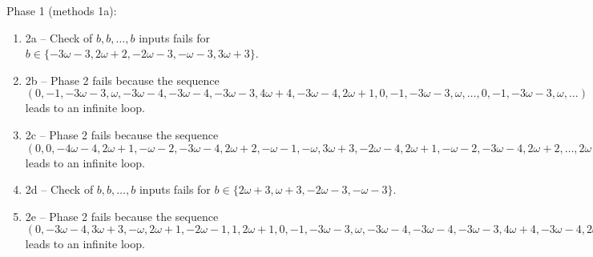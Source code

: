 \begin{exmp}
Phase 1 (methods 1a):
\begin{enumerate}[ ]
\item  2a -- Check of $b,\allowbreak b,\allowbreak \dots,\allowbreak b$ inputs fails for $b\in \{-3\omega - 3,\allowbreak  2\omega + 2,\allowbreak  -2\omega - 3,\allowbreak  -\omega - 3,\allowbreak  3\omega + 3\}$.
\item  2b -- Phase 2   fails because  the sequence $(0,\allowbreak  -1,\allowbreak  -3\omega - 3,\allowbreak  \omega,\allowbreak  -3\omega - 4,\allowbreak  -3\omega - 4,\allowbreak  -3\omega - 3,\allowbreak  4\omega + 4,\allowbreak  -3\omega - 4,\allowbreak  2\omega + 1,\allowbreak  0,\allowbreak  -1,\allowbreak  -3\omega - 3,\allowbreak  \omega,\allowbreak  \dots ,\allowbreak 0,\allowbreak  -1,\allowbreak  -3\omega - 3,\allowbreak  \omega,\allowbreak  \dots)$ leads to an infinite loop.
\item  2c -- Phase 2   fails because  the sequence $(0,\allowbreak  0,\allowbreak  -4\omega - 4,\allowbreak  2\omega + 1,\allowbreak  -\omega - 2,\allowbreak  -3\omega - 4,\allowbreak  2\omega + 2,\allowbreak  -\omega - 1,\allowbreak  -\omega,\allowbreak  3\omega + 3,\allowbreak  -2\omega - 4,\allowbreak  2\omega + 1,\allowbreak  -\omega - 2,\allowbreak  -3\omega - 4,\allowbreak  2\omega + 2,\allowbreak  \dots ,\allowbreak 2\omega + 1,\allowbreak  -\omega - 2,\allowbreak  -3\omega - 4,\allowbreak  2\omega + 2,\allowbreak  \dots)$ leads to an infinite loop.
\item  2d -- Check of $b,\allowbreak b,\allowbreak \dots,\allowbreak b$ inputs fails for $b\in \{2\omega + 3,\allowbreak  \omega + 3,\allowbreak  -2\omega - 3,\allowbreak  -\omega - 3\}$.
\item  2e -- Phase 2   fails because  the sequence $(0,\allowbreak  -3\omega - 4,\allowbreak  3\omega + 3,\allowbreak  -\omega,\allowbreak  2\omega + 1,\allowbreak  -2\omega - 1,\allowbreak  1,\allowbreak  2\omega + 1,\allowbreak  0,\allowbreak  -1,\allowbreak  -3\omega - 3,\allowbreak  \omega,\allowbreak  -3\omega - 4,\allowbreak  -3\omega - 4,\allowbreak  -3\omega - 3,\allowbreak  4\omega + 4,\allowbreak  -3\omega - 4,\allowbreak  2\omega + 1,\allowbreak  0,\allowbreak  -1,\allowbreak  -3\omega - 3,\allowbreak  \dots ,\allowbreak 2\omega + 1,\allowbreak  0,\allowbreak  -1,\allowbreak  -3\omega - 3,\allowbreak  \dots)$ leads to an infinite loop.
\end{enumerate}


\end{exmp}




